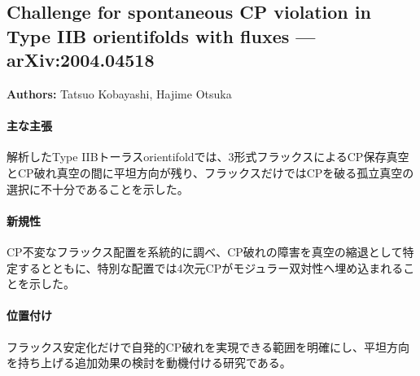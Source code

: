\subsection{Challenge for spontaneous CP violation in Type IIB orientifolds with fluxes --- arXiv:2004.04518}

\textbf{Authors:} Tatsuo Kobayashi, Hajime Otsuka

\paragraph{主な主張}
解析したType IIBトーラスorientifoldでは、3形式フラックスによるCP保存真空とCP破れ真空の間に平坦方向が残り、フラックスだけではCPを破る孤立真空の選択に不十分であることを示した。 \cite{Kobayashi:2020uaj}

\paragraph{新規性}
CP不変なフラックス配置を系統的に調べ、CP破れの障害を真空の縮退として特定するとともに、特別な配置では4次元CPがモジュラー双対性へ埋め込まれることを示した。

\paragraph{位置付け}
フラックス安定化だけで自発的CP破れを実現できる範囲を明確にし、平坦方向を持ち上げる追加効果の検討を動機付ける研究である。
